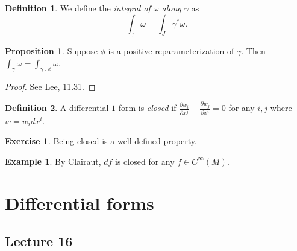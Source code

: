 \documentclass[10pt,letterpaper,cm]{nupset}
\theoremstyle{definition}
\newtheorem*{definition}{Definition}
\newtheorem{exmp}{Example}
\newtheorem{exercise}{Exercise}
\newtheorem{prop}{Proposition}
\newcommand{\1}{\mathbf{1}}
\newcommand{\0}{\vec 0}
\begin{document}
\begin{definition}
We define the \textit{integral of $\omega$ along $\gamma$} as $$\int_{\gamma} \omega = \int_J \gamma^{\ast}\omega.$$ 
\end{definition}

\begin{prop}
Suppose $\phi$ is a positive reparameterization of $\gamma$. Then $\int_{\gamma} \omega = \int_{\gamma \circ \phi} \omega$.
\end{prop}
\begin{proof}
See Lee, 11.31.
\end{proof}

\begin{definition}
A differential $1$-form is \textit{closed} if $\frac{\partial{w_i}}{\partial{x^j}} - \frac{\partial{w_j}}{\partial{x^i}} =0$ for any $i,j$ where $w = w_i dx^i$.
\end{definition}

\begin{exercise}
Being closed is a well-defined property.
\end{exercise}

\begin{exmp}
By Clairaut, $df$ is closed for any $f\in C^{\infty}(M)$. 
\end{exmp}

\section{Differential forms}

\subsection{Lecture 16}
\end{document}
